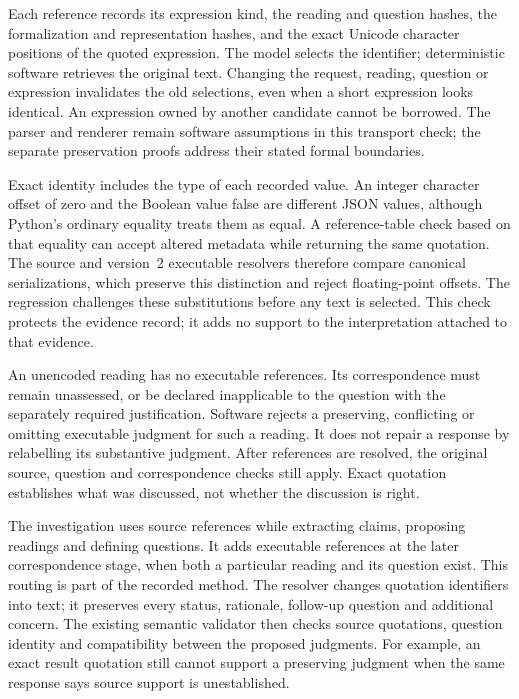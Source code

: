 Each reference records its expression kind, the reading and question hashes,
the formalization and representation hashes, and the exact Unicode character
positions of the quoted expression. The model selects the identifier;
deterministic software retrieves the original text. Changing the request,
reading, question or expression invalidates the old selections, even when a
short expression looks identical. An expression owned by another candidate
cannot be borrowed. The parser and renderer remain software assumptions in
this transport check; the separate preservation proofs address their stated
formal boundaries.

Exact identity includes the type of each recorded value. An integer character
offset of zero and the Boolean value false are different JSON values, although
Python's ordinary equality treats them as equal. A reference-table check based
on that equality can accept altered metadata while returning the same quotation.
The source and version~2 executable resolvers therefore compare canonical
serializations, which preserve this distinction and reject floating-point
offsets. The regression challenges these substitutions before any text is
selected. This check protects the evidence record; it adds no support to the
interpretation attached to that evidence.

An unencoded reading has no executable references. Its correspondence must
remain unassessed, or be declared inapplicable to the question with the
separately required justification. Software rejects a preserving, conflicting
or omitting executable judgment for such a reading. It does not repair a
response by relabelling its substantive judgment. After references are
resolved, the original source, question and correspondence checks still apply.
Exact quotation establishes what was discussed, not whether the discussion
is right.

The investigation uses source references while extracting claims, proposing
readings and defining questions. It adds executable references at the later
correspondence stage, when both a particular reading and its question exist.
This routing is part of the recorded method. The resolver changes quotation
identifiers into text; it preserves every status, rationale, follow-up question
and additional concern. The existing semantic validator then checks source
quotations, question identity and compatibility between the proposed judgments.
For example, an exact result quotation still cannot support a preserving
judgment when the same response says source support is unestablished.

